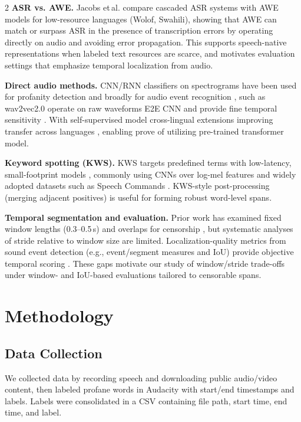 \documentclass[11pt,a4paper]{article}
\begin{document}
\begin{multicols}{2}
	\textbf{ASR vs. AWE.} Jacobs et\,al. \cite{jacobs2023hatespeechdetectionlowresource} compare cascaded ASR systems with AWE models for low-resource languages (Wolof, Swahili), showing that AWE can match or surpass ASR in the presence of transcription errors by operating directly on audio and avoiding error propagation. This supports speech-native representations when labeled text resources are scarce, and motivates evaluation settings that emphasize temporal localization from audio.

  \textbf{Direct audio methods.} CNN/RNN classifiers on spectrograms have been used for profanity detection \cite{9900333} and broadly for audio event recognition \cite{7324337}, such as wav2vec2.0 operate on raw waveforms E2E CNN and provide fine temporal sensitivity \cite{baevski2020wav2vec20frameworkselfsupervised}. With self-supervised model cross-lingual extensions improving transfer across languages \cite{conneau2021unsupervised,babu2021xlsr}, enabling prove of utilizing pre-trained transformer model.

  \textbf{Keyword spotting (KWS).} KWS targets predefined terms with low-latency, small-footprint models \cite{9665775}, commonly using CNNs over log-mel features \cite{sainath15b_interspeech} and widely adopted datasets such as Speech Commands \cite{warden2018speechcommands}. KWS-style post-processing (merging adjacent positives) is useful for forming robust word-level spans.

	\textbf{Temporal segmentation and evaluation.} Prior work has examined fixed window lengths (0.3--0.5\,s) and overlaps for censorship \cite{9900333}, but systematic analyses of stride relative to window size are limited. Localization-quality metrics from sound event detection (e.g., event/segment measures and IoU) provide objective temporal scoring \cite{app6060162,an-etal-2024-investigation}. These gaps motivate our study of window/stride trade-offs under window- and IoU-based evaluations tailored to censorable spans.

\section{Methodology}
\subsection{Data Collection}
We collected data by recording speech and downloading public audio/video content, then labeled profane words in Audacity with start/end timestamps and labels. Labels were consolidated in a CSV containing file path, start time, end time, and label.


\end{multicols}
\end{document}
